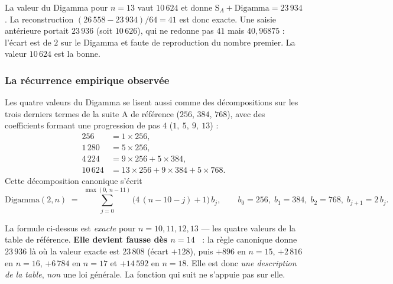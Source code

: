 \documentclass[11pt,a4paper]{article}
\newcommand{\SA}{\mathrm{S}_A}
\begin{document}
\vspace{0.3cm}
\begin{boitenote}
La valeur du Digamma pour $n = 13$ vaut $10\,624$ et donne
$\SA + \mathrm{Digamma} = 23\,934$. La reconstruction
$(26\,558-23\,934)/64 = 41$ est donc exacte. Une saisie antérieure
portait $23\,936$ (soit $10\,626$), qui ne redonne pas $41$ mais
$40{,}96875$ : l'écart est de $2$ sur le Digamma et faute de
reproduction du nombre premier. La valeur $10\,624$ est la bonne.
\end{boitenote}


\subsubsection{La récurrence empirique observée}

Les quatre valeurs du Digamma se lisent aussi comme des décompositions
sur les trois derniers termes de la suite A de référence
($256$, $384$, $768$), avec des coefficients formant une progression
de pas $4$ ($1,\ 5,\ 9,\ 13$) :
\begin{align*}
  256     &= 1\times256,\\
  1\,280  &= 5\times256,\\
  4\,224  &= 9\times256 + 5\times384,\\
  10\,624 &= 13\times256 + 9\times384 + 5\times768.
\end{align*}
Cette décomposition canonique s'écrit
\begin{equation*}
  \mathrm{Digamma}(2,n) \;=\; \sum_{j=0}^{\max(0,\,n-11)}
  \bigl(4\,(n-10-j)+1\bigr)\,b_j,
  \qquad
  b_0 = 256,\; b_1 = 384,\; b_2 = 768,\; b_{j+1} = 2\,b_j .
\end{equation*}

\vspace{0.3cm}
\begin{boitealerte}
La formule ci-dessus est \emph{exacte} pour $n = 10, 11, 12, 13$ --- les
quatre valeurs de la table de référence. \textbf{Elle devient fausse
dès $n = 14$~} : la règle canonique donne $23\,936$ là où la valeur
exacte est $23\,808$ (écart $+128$), puis $+896$ en $n = 15$,
$+2\,816$ en $n = 16$, $+6\,784$ en $n = 17$ et $+14\,592$ en $n = 18$.
Elle est donc \emph{une description de la table}, \emph{non} une
loi générale. La fonction qui suit ne s'appuie pas sur elle.
\end{boitealerte}
\end{document}
